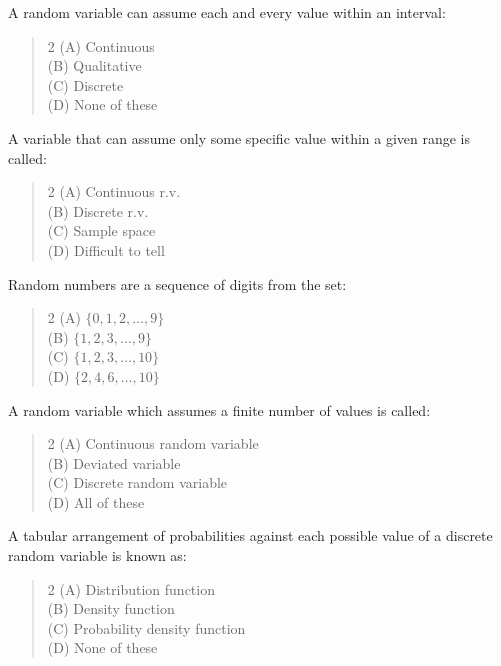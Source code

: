 \documentclass[11pt,a4paper]{article}
\begin{document}
\begin{mcqlist}
\item A \underline{\hspace{1.5cm}} random variable can assume each and every value within an interval:
\begin{quote}\begin{multicols}{2}
\noindent (A) Continuous \\
(B) Qualitative \\
(C) Discrete \\
(D) None of these
\end{multicols}\end{quote}

\item A variable that can assume only some specific value within a given range is called:
\begin{quote}\begin{multicols}{2}
\noindent (A) Continuous r.v. \\
(B) Discrete r.v. \\
(C) Sample space \\
(D) Difficult to tell
\end{multicols}\end{quote}

\item Random numbers are a sequence of digits from the set:
\begin{quote}\begin{multicols}{2}
\noindent (A) $\{0,1,2,\ldots,9\}$ \\
(B) $\{1,2,3,\ldots,9\}$ \\
(C) $\{1,2,3,\ldots,10\}$ \\
(D) $\{2,4,6,\ldots,10\}$
\end{multicols}\end{quote}

\item A random variable which assumes a finite number of values is called:
\begin{quote}\begin{multicols}{2}
\noindent (A) Continuous random variable \\
(B) Deviated variable \\
(C) Discrete random variable \\
(D) All of these
\end{multicols}\end{quote}

\item A tabular arrangement of probabilities against each possible value of a discrete random variable is known as:
\begin{quote}\begin{multicols}{2}
\noindent (A) Distribution function \\
(B) Density function \\
(C) Probability density function \\
(D) None of these
\end{multicols}\end{quote}


\end{mcqlist}
\end{document}
